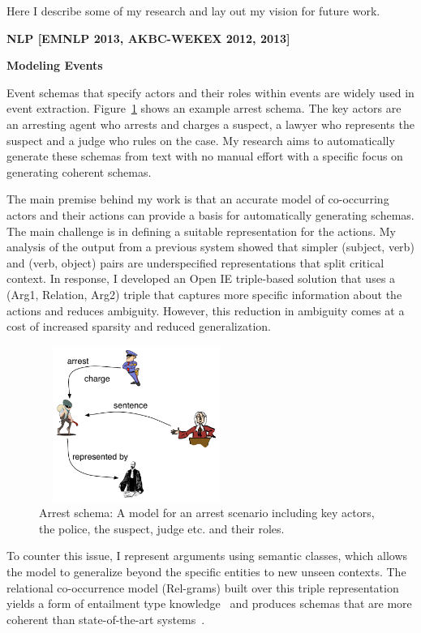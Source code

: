 \documentclass[a4paper,11pt,onecolumn]{article}
\begin{document}
Here I describe some of my research and lay out my vision for future work.

{\bf NLP [EMNLP 2013, AKBC-WEKEX 2012, 2013]}

{\bf Modeling Events}

Event schemas that specify actors and their roles within events are widely used in event extraction. Figure~\ref{fig:arrest} shows an example arrest schema. The key actors are an arresting agent who arrests and charges a suspect, a lawyer who represents the suspect and a judge who rules on the case. My research aims to automatically generate these schemas from text with no manual effort with a specific focus on generating coherent schemas.

The main premise behind my work is that an accurate model of co-occurring actors and their actions can provide a basis for automatically generating schemas. The main challenge is in defining a suitable representation for the actions. My analysis of the output from a previous system showed that simpler (subject, verb) and (verb, object) pairs are underspecified representations that split critical context. In response, I developed an Open IE triple-based solution that uses a (Arg1, Relation, Arg2) triple that captures more specific information about the actions and reduces ambiguity. However, this reduction in ambiguity comes at a cost of increased sparsity and reduced generalization. 
\begin{figure}
	\vspace{-2ex}
	\begin{center}
	\includegraphics[width=2.5in,height=2in]{figures/arrest-scenario} 	
	\vspace{-2ex}
	\caption{\label{fig:arrest} {\small Arrest schema: A model for an arrest scenario including key actors, the police, the suspect, judge etc. and their roles.}}
	\vspace{-2ex}
	\end{center}
\end{figure}
To counter this issue, I represent arguments using semantic classes, which allows the model to generalize beyond the specific entities to new unseen contexts. The relational co-occurrence model (Rel-grams) built over this triple representation yields a form of entailment type knowledge~\cite{balasubramanian-akbc12} and produces schemas that are more coherent than state-of-the-art systems~\cite{balasubramanian-emnlp13}.
\end{document}
